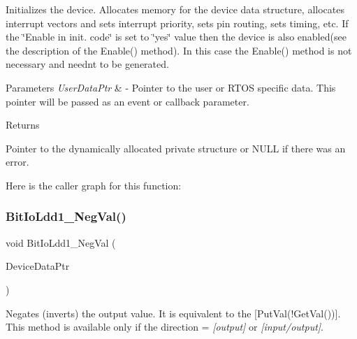 Initializes the device. Allocates memory for the device data structure, allocates interrupt vectors and sets interrupt priority, sets pin routing, sets timing, etc. If the \char`\"{}\+Enable
    in init. code\char`\"{} is set to \char`\"{}yes\char`\"{} value then the device is also enabled(see the description of the Enable() method). In this case the Enable() method is not necessary and needn\textquotesingle{}t to be generated. 


\begin{DoxyParams}{Parameters}
{\em User\+Data\+Ptr} & -\/ Pointer to the user or R\+T\+OS specific data. This pointer will be passed as an event or callback parameter. \\
\hline
\end{DoxyParams}
\begin{DoxyReturn}{Returns}

\begin{DoxyItemize}
\item Pointer to the dynamically allocated private structure or N\+U\+LL if there was an error. 
\end{DoxyItemize}
\end{DoxyReturn}
Here is the caller graph for this function\+:
\mbox{\label{group___bit_io_ldd1__module_ga6e66b99e22798dceaadbfffe984ce5d3}} 
\subsubsection{\texorpdfstring{Bit\+Io\+Ldd1\+\_\+\+Neg\+Val()}{BitIoLdd1\_NegVal()}}
{\footnotesize\ttfamily void Bit\+Io\+Ldd1\+\_\+\+Neg\+Val (\begin{DoxyParamCaption}\item[{\hyperlink{group___p_e___types__module_gac5cf1362f1f0e3a2ce71b1bf2276d091}{L\+D\+D\+\_\+\+T\+Device\+Data} $\ast$}]{Device\+Data\+Ptr }\end{DoxyParamCaption})}



Negates (inverts) the output value. It is equivalent to the \mbox{[}Put\+Val(!\+Get\+Val())\mbox{]}. This method is available only if the direction = {\itshape \mbox{[}output\mbox{]}} or {\itshape \mbox{[}input/output\mbox{]}}. 


